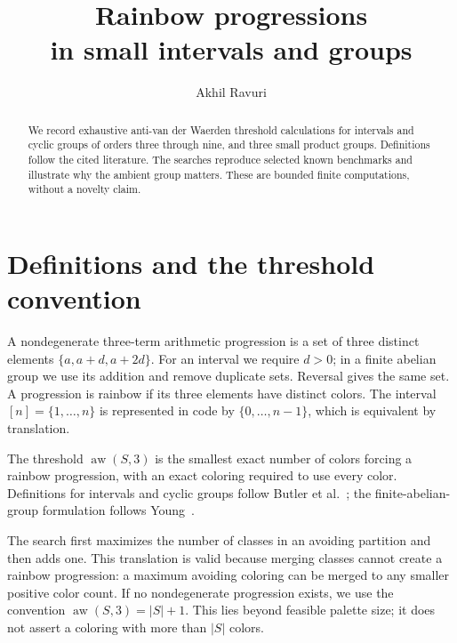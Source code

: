 \documentclass[10pt,letterpaper]{article}
\title{\vspace{-1.5em}\LARGE\bfseries Rainbow progressions\\in small intervals and groups}
\author{Akhil Ravuri}\date{}
\newcommand{\aw}{\operatorname{aw}}
\begin{document}
\maketitle\vspace{-1.5em}
\begin{abstract}
We record exhaustive anti-van der Waerden threshold calculations for intervals
and cyclic groups of orders three through nine, and three small product
groups. Definitions follow the cited literature. The searches reproduce
selected known benchmarks and illustrate why the ambient group matters.
These are bounded finite computations, without a novelty claim.
\end{abstract}

\section{Definitions and the threshold convention}
A nondegenerate three-term arithmetic progression is a set of three distinct
elements $\{a,a+d,a+2d\}$. For an interval we require $d>0$; in a finite
abelian group we use its addition and remove duplicate sets. Reversal gives
the same set. A progression is rainbow if its three elements have distinct
colors. The interval $[n]=\{1,\ldots,n\}$ is represented in code by
$\{0,\ldots,n-1\}$, which is equivalent by translation.

The threshold $\aw(S,3)$ is the smallest exact number of colors forcing a
rainbow progression, with an exact coloring required to use every color.
Definitions for intervals and cyclic groups follow Butler et al.~\cite{BE};
the finite-abelian-group formulation follows Young~\cite{Y}.

The search first maximizes the number of classes in an avoiding partition and
then adds one. This translation is valid because merging classes cannot
create a rainbow progression: a maximum avoiding coloring can be merged to
any smaller positive color count. If no nondegenerate progression exists, we
use the convention $\aw(S,3)=|S|+1$. This lies beyond feasible palette size;
it does not assert a coloring with more than $|S|$ colors.
\end{document}
